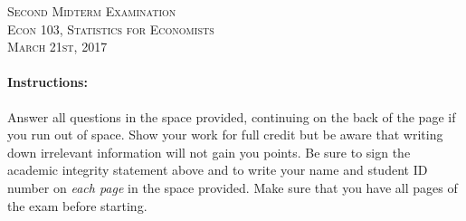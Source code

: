 \documentclass[addpoints,12pt]{exam}
\begin{document}
\begin{center}
\textsc{\large Second Midterm Examination\\ \normalsize Econ 103, Statistics for Economists \\ \vspace{0.5em} March 21st, 2017}

\vspace{2em}



\end{center}


\vspace{2em}
\begin{center}
\end{center}
\vspace{0.2in}

\vspace{0.2in}

\noindent{}

\vspace{0.2in}

\noindent{}
\hfill
{}

\vspace{2em}

\begin{center}
  \gradetable[h][questions]
\end{center}

\vspace{2em}

\paragraph{Instructions:} Answer all questions in the space provided, continuing on the back of the page if you run out of space. Show your work for full credit but be aware that writing down irrelevant information will not gain you points. Be sure to sign the academic integrity statement above and to write your name and student ID number on \emph{each page} in the space provided. Make sure that you have all pages of the exam before starting.
\end{document}
